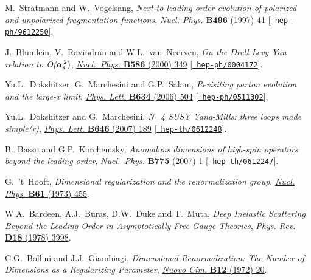 \documentclass[12pt]{article}
\def\as(#1){{\alpha_{\rm s}^{\,#1}}}
\begin{document}
{\begin{thebibliography}{100}
M.~Stratmann and W.~Vogelsang, \emph{{Next-to-leading order evolution of
  polarized and unpolarized fragmentation functions}},
  \href{https://dx.doi.org/10.1016/S0550-3213(97)00182-X}{\emph{Nucl. Phys.}
  {\bf B496} (1997) 41} [\href{https://arxiv.org/abs/hep-ph/9612250}{{\tt
  hep-ph/9612250}}].

J.~Bl{\"u}mlein, V.~Ravindran and W.L.~van~Neerven, \emph{{On the
  Drell-Levy-Yan relation to O($\as(2))$}},
  \href{https://dx.doi.org/10.1016/S0550-3213(00)00422-3}{\emph{Nucl.~Phys.}
  {\bf B586} (2000) 349} [\href{https://arxiv.org/abs/hep-ph/0004172}{{\tt
  hep-ph/0004172}}].

{\relax Yu}.L.~Dokshitzer, G.~Marchesini and G.P.~Salam, \emph{{Revisiting
  parton evolution and the large-x limit}},
  \href{https://dx.doi.org/10.1016/j.physletb.2006.02.023}{\emph{Phys. Lett.}
  {\bf B634} (2006) 504} [\href{https://arxiv.org/abs/hep-ph/0511302}{{\tt
  hep-ph/0511302}}].

{\relax Yu}.L.~Dokshitzer and G.~Marchesini, \emph{{N=4 SUSY Yang-Mills: three
  loops made simple(r)}},
  \href{https://dx.doi.org/10.1016/j.physletb.2007.01.016}{\emph{Phys. Lett.}
  {\bf B646} (2007) 189} [\href{https://arxiv.org/abs/hep-th/0612248}{{\tt
  hep-th/0612248}}].

B.~Basso and G.P.~Korchemsky, \emph{{Anomalous dimensions of high-spin
  operators beyond the leading order}},
  \href{https://dx.doi.org/10.1016/j.nuclphysb.2007.03.044}{\emph{Nucl.~Phys.}
  {\bf B775} (2007) 1} [\href{https://arxiv.org/abs/hep-th/0612247}{{\tt
  hep-th/0612247}}].

G.~'t~Hooft, \emph{{Dimensional regularization and the renormalization group}},
  \href{https://dx.doi.org/10.1016/0550-3213(73)90376-3}{\emph{Nucl. Phys.}
  {\bf B61} (1973) 455}.

W.A.~Bardeen, A.J.~Buras, D.W.~Duke and T.~Muta, \emph{{Deep Inelastic
  Scattering Beyond the Leading Order in Asymptotically Free Gauge Theories}},
  \href{https://dx.doi.org/10.1103/PhysRevD.18.3998}{\emph{Phys. Rev.} {\bf
  D18} (1978) 3998}.

C.G.~Bollini and J.J.~Giambiagi, \emph{{Dimensional Renormalization: The Number
  of Dimensions as a Regularizing Parameter}},
  \href{https://dx.doi.org/10.1007/BF02895558}{\emph{Nuovo Cim.} {\bf B12}
  (1972) 20}.


\end{thebibliography}}
\end{document}
